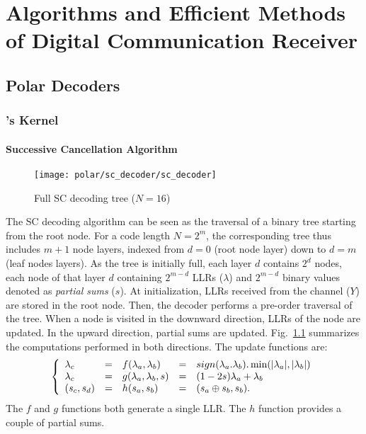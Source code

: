 \graphicspath{{main/chapter2/fig/}}

\chapter{Algorithms and Efficient Methods of Digital Communication Receiver}

\minitoccustom

\section{Polar Decoders}
\label{sec:alg_polar_decoders}

\subsection{\Arikan's Kernel}

\subsubsection{Successive Cancellation Algorithm}

\begin{figure}[htp]
  \centering
  \texttt{[image: polar/sc\_decoder/sc\_decoder]}
  \caption{Full SC decoding tree ($N = 16$)}
  \label{fig:polar_sc_decoder}
\end{figure}

The SC decoding algorithm can be seen as the traversal of a binary tree starting
from the root node. For a code length $N=2^m$, the corresponding tree thus
includes $m + 1$ node layers, indexed from $d=0$ (root node layer) down to
$d=m$ (leaf nodes layers). As the tree is initially full, each layer $d$
contains $2^d$ nodes, each node of that layer $d$  containing $2^{m-d}$ LLRs
($\lambda$) and $2^{m-d}$ binary values denoted as \textit{partial sums} ($s$).
At initialization, LLRs received  from the channel ($Y$) are stored in the root
node. Then, the decoder performs a pre-order traversal of the tree. When a node
is visited in the downward direction, LLRs of the node are updated. In the
upward direction, partial sums are updated. Fig.~\ref{fig:polar_sc_decoder}
summarizes the computations performed in both directions. The update functions
are:
\begin{eqnarray}
\left\{\begin{array}{l c l c l}
\lambda_c &=& f(\lambda_a,\lambda_b) &=& sign(\lambda_a.\lambda_b).\min(|\lambda_a|,|\lambda_b|)\\
\lambda_c &=& g(\lambda_a,\lambda_b,s)&=&(1-2s)\lambda_a+\lambda_b\\
(s_{c}, s_{d}) &=& h(s_{a}, s_{b}) &=& (s_{a} \oplus s_{b}, s_{b}).
\end{array}\right.
\label{eq:polar_f_g_h}
\end{eqnarray}
The $f$ and $g$ functions both generate a single LLR. The $h$ function provides
a couple of partial sums.

